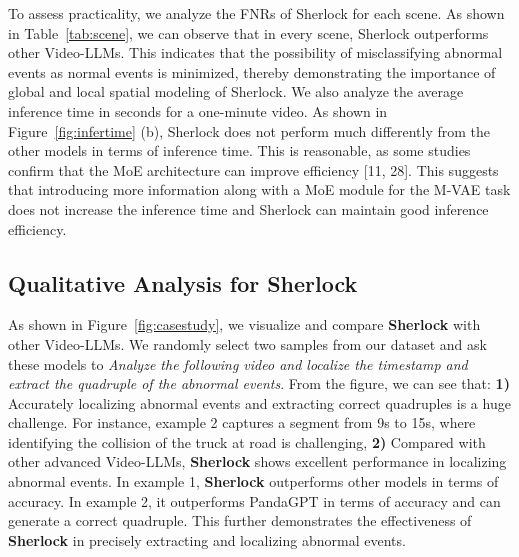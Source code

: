 To assess practicality, we analyze the FNRs of Sherlock for each scene. As shown in Table~\ref{tab:scene}, we can observe that in every scene, Sherlock outperforms other Video-LLMs. This indicates that the possibility of misclassifying abnormal events as normal events is minimized, thereby demonstrating the importance of global and local spatial modeling of Sherlock. We also analyze the average inference time in seconds for a one-minute video. As shown in Figure~\ref{fig:infertime} (b), Sherlock does not
perform much differently from the other models in terms of inference time. This is reasonable, as some studies confirm that the MoE architecture can improve efficiency [11, 28]. This suggests that introducing more information along with a MoE module for the M-VAE task does not increase the inference time and Sherlock can maintain good inference efficiency.



\subsection{Qualitative Analysis for Sherlock}
As shown in Figure~\ref{fig:casestudy}, we visualize and compare \textbf{Sherlock} with other Video-LLMs. We randomly select two samples from our dataset and ask these models to \emph{Analyze the following video and localize the timestamp and extract the quadruple of the abnormal events}. From the figure, we can see that: \textbf{1)} Accurately localizing abnormal events and extracting correct quadruples is a huge challenge. For instance, example 2 captures a segment from 9s to 15s, where identifying the collision of the truck at road is challenging, \textbf{2)} Compared with other advanced Video-LLMs, \textbf{Sherlock} shows excellent performance in localizing abnormal events. In example 1, \textbf{Sherlock} outperforms other models in terms of accuracy. In example 2, it outperforms PandaGPT in terms of accuracy and can generate a correct quadruple. This further demonstrates the effectiveness of \textbf{Sherlock} in precisely extracting and localizing abnormal events.